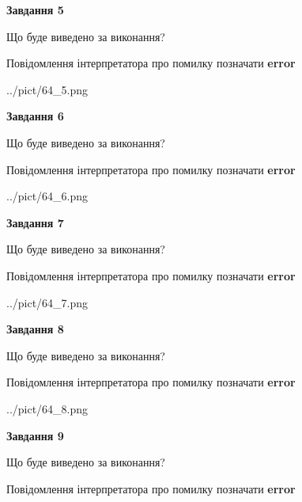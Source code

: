 \documentclass[11pt, ukrainian]{article}
\begin{document}
{\begin {large}
{\begin {center}\textbf{Завдання 5}\end {center}}\par
Що буде виведено за виконання? \par
Повідомлення інтерпретатора про помилку позначати \textbf{error}

\begin{center}
	{../pict/64_5.png}
\end{center}
\newpage

{\begin {center}\textbf{Завдання 6}\end {center}}\par
Що буде виведено за виконання? \par
Повідомлення інтерпретатора про помилку позначати \textbf{error}

\begin{center}
	{../pict/64_6.png}
\end{center}
\newpage

{\begin {center}\textbf{Завдання 7}\end {center}}\par
Що буде виведено за виконання? \par
Повідомлення інтерпретатора про помилку позначати \textbf{error}

\begin{center}
	{../pict/64_7.png}
\end{center}
\newpage

{\begin {center}\textbf{Завдання 8}\end {center}}\par
Що буде виведено за виконання? \par
Повідомлення інтерпретатора про помилку позначати \textbf{error}

\begin{center}
	{../pict/64_8.png}
\end{center}
\newpage

{\begin {center}\textbf{Завдання 9}\end {center}}\par
Що буде виведено за виконання? \par
Повідомлення інтерпретатора про помилку позначати \textbf{error}


\end{large}}
\end{document}
